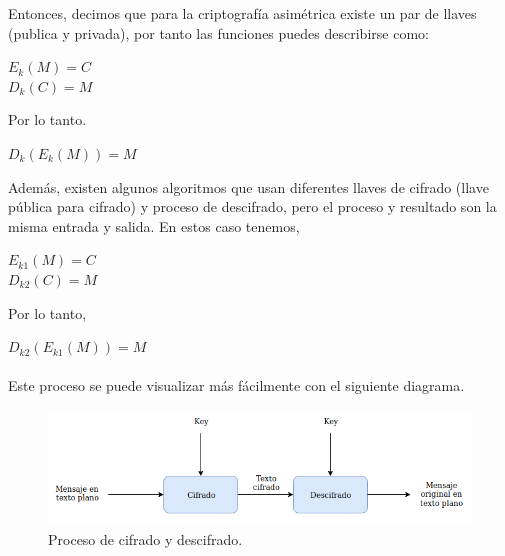 \documentclass[12pt, a4paper, titlepage]{article}
\begin{document}
		
		
		Entonces, decimos que para la criptografía asimétrica existe un par de llaves (publica y privada), por tanto las funciones puedes describirse como:
		
		\begin{center}
		$E_{k}(M) = C$
		\\
		$D_{k}(C) = M$
		\end{center}
		
		Por lo tanto.
		
		\begin{center}
		    $D_{k}(E_{k}(M)) = M$
		\end{center}
		
		Además, existen algunos algoritmos que usan diferentes llaves de cifrado (llave pública para cifrado) y proceso de descifrado, pero el proceso y resultado son la misma entrada y salida. En estos caso tenemos,
		
		\begin{center}
    		$E_{k1}(M) = C$
    		\\
    		$D_{k2}(C) = M$
		\end{center}
		
		Por lo tanto,
		
		\begin{center}
		    $D_{k2}(E_{k1}(M)) = M$
		\end{center}
		
		\paragraph{}
		Este proceso se puede visualizar más fácilmente con el siguiente diagrama.
		
		\begin{figure}[!htb]
			\begin{center}	        	\includegraphics[width=14cm]{./imagenes/procesoCifrado.png}
				\caption{Proceso de cifrado y descifrado.}
			\end{center}
		\end{figure}
	
\end{document}
